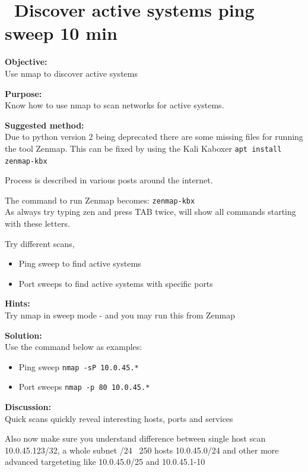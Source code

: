 \documentclass[a4paper,11pt,notitlepage]{report}
\begin{document}
\chapter{\faExclamationTriangle\ Discover active systems ping sweep 10 min}
\label{ex:nmap-pingsweep}

{\bf Objective:}\\
Use nmap to discover active systems

{\bf Purpose:}\\
Know how to use nmap to scan networks for active systems.

{\bf Suggested method:}\\

Due to python version 2 being deprecated there are some missing files for running the tool Zenmap. This can be fixed by using the Kali Kaboxer \verb+apt install zenmap-kbx+

Process is described in various posts around the internet. 

The command to run Zenmap becomes: \verb+zenmap-kbx+\\
As always try typing zen and press TAB twice, will show all commands starting with these letters.

Try different scans,
\begin{itemize}
\item Ping sweep to find active systems
\item Port sweeps to find active systems with specific ports
\end{itemize}

{\bf Hints:} \\
Try nmap in sweep mode - and you may run this from Zenmap

{\bf Solution:}\\
Use the command below as examples:
\begin{itemize}
\item Ping sweep \verb+nmap -sP 10.0.45.*+
\item Port sweeps \verb+nmap -p 80 10.0.45.*+
\end{itemize}

{\bf Discussion:}\\
Quick scans quickly reveal interesting hosts, ports and services

Also now make sure you understand difference between single host scan
10.0.45.123/32, a whole subnet /24 ~250 hosts 10.0.45.0/24 and other more advanced targeteting like 10.0.45.0/25 and 10.0.45.1-10
\end{document}
